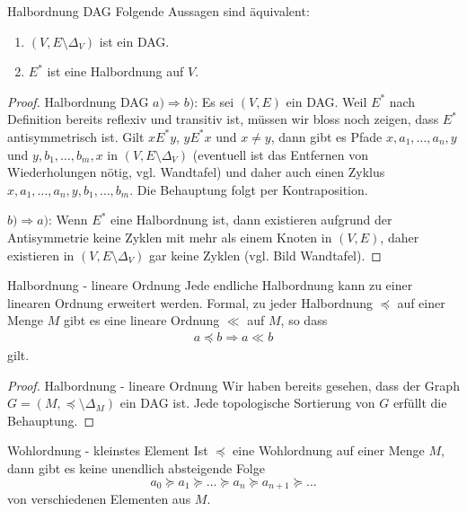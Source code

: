     \begin{lemma}{Halbordnung DAG}
        Folgende Aussagen sind äquivalent:
        \begin{enumerate}
            \item $(V,E\setminus \Delta_V)$ ist ein DAG.
            \item $E^*$ ist eine Halbordnung auf $V$.
        \end{enumerate}
    \end{lemma}
    
    \begin{proof}{Halbordnung DAG}
        $a)\Rightarrow b)$: Es sei $(V,E)$ ein DAG. Weil $E^*$ nach Definition bereits
        reflexiv und transitiv ist, müssen wir bloss noch zeigen, dass $E^*$
        antisymmetrisch ist. Gilt $xE^*y$, $yE^*x$ und $x\neq y$, dann gibt es
        Pfade $x,a_1,\dots,a_n,y$ und $y,b_1,\dots,b_m,x$ in $(V,E\setminus \Delta_V)$ (eventuell ist das Entfernen von Wiederholungen nötig, vgl. Wandtafel) und daher auch
        einen Zyklus $x,a_1,\dots,a_n,y,b_1,\dots,b_m$. Die Behauptung folgt per
        Kontraposition.

        $b)\Rightarrow a)$: Wenn $E^*$ eine Halbordnung ist, dann existieren aufgrund der
        Antisymmetrie keine Zyklen mit mehr als einem Knoten in $(V,E)$, daher existieren in
        $(V,E\setminus\Delta_V)$ gar keine Zyklen (vgl. Bild Wandtafel).
    \end{proof}

    \begin{corollary}{Halbordnung - lineare Ordnung}
        Jede endliche Halbordnung kann zu einer linearen Ordnung erweitert werden. Formal, zu jeder Halbordnung $\preceq$ auf einer Menge $M$ gibt es eine lineare Ordnung $\ll$ auf $M$, so dass
        \begin{align*}
        a\preceq b \Rightarrow a\ll b
        \end{align*}
        gilt.
    \end{corollary}
    
    \begin{proof}{Halbordnung - lineare Ordnung}
        Wir haben bereits gesehen, dass der Graph $G=(M,\preceq\setminus\Delta_M)$ ein DAG ist. Jede topologische Sortierung von $G$ erfüllt die Behauptung.
    \end{proof}


    \begin{lemma}{Wohlordnung - kleinstes Element}
    Ist $\preceq$ eine Wohlordnung auf einer Menge $M$, dann gibt es keine unendlich absteigende Folge
    \[
    a_0\succeq a_1\succeq\dots\succeq a_n\succeq a_{n+1}\succeq\dots
    \]
    von verschiedenen Elementen aus $M$.
    \end{lemma}
    
